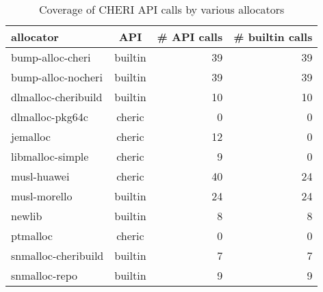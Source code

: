 \begin{table}[t]
\begin{center}
\begin{tabular}{lcrr}
\toprule
allocator & API & \# API calls & \# builtin calls \\
\midrule
bump-alloc-cheri & builtin & 39 & 39\\
bump-alloc-nocheri & builtin & 39 & 39\\
dlmalloc-cheribuild & builtin & 10 & 10\\
dlmalloc-pkg64c & cheric & 0 & 0\\
jemalloc & cheric & 12 & 0\\
libmalloc-simple & cheric & 9 & 0\\
musl-huawei & cheric & 40 & 24\\
musl-morello & builtin & 24 & 24\\
newlib & builtin & 8 & 8\\
ptmalloc & cheric & 0 & 0\\
snmalloc-cheribuild & builtin & 7 & 7\\
snmalloc-repo & builtin & 9 & 9
\\ \bottomrule
\end{tabular}
\caption{\label{tab:rq1}Coverage of CHERI API calls by various allocators}
\label{tab:atks}
\end{center}
\end{table}